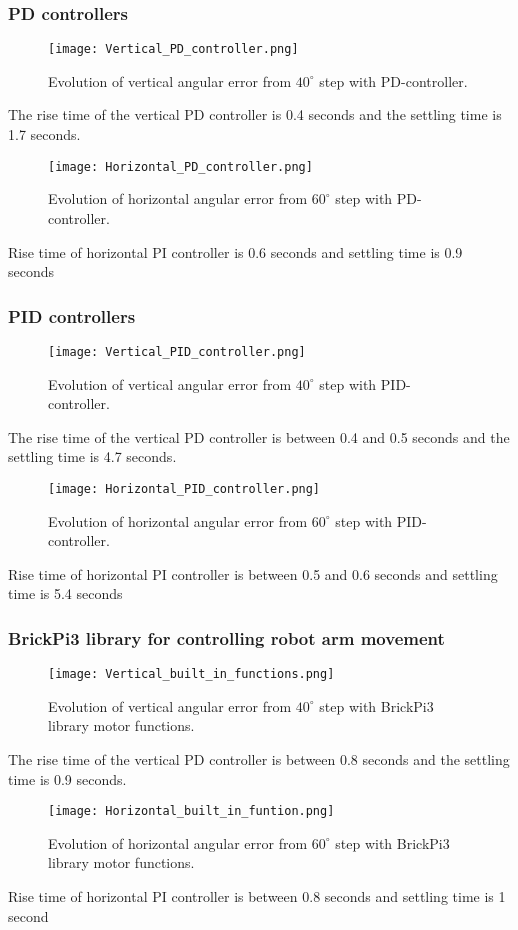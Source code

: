 \subsubsection{PD controllers}
\begin{figure}[H]
\centering
\texttt{[image: Vertical\_PD\_controller.png]}
\caption{Evolution of vertical angular error from \(40^{\circ}\) step with PD-controller.}
\label{vert_P}
\end{figure}
The rise time of the vertical PD controller is 0.4 seconds and the settling time is 1.7 seconds.
\begin{figure}[H]
\centering
\texttt{[image: Horizontal\_PD\_controller.png]}
\caption{Evolution of horizontal angular error from \(60^{\circ}\) step with PD-controller.}
\label{vert_P}
\end{figure}
Rise time of horizontal PI controller is 0.6 seconds and settling time is 0.9 seconds

\subsubsection{PID controllers}
\begin{figure}[H]
\centering
\texttt{[image: Vertical\_PID\_controller.png]}
\caption{Evolution of vertical angular error from \(40^{\circ}\) step with PID-controller.}
\label{vert_P}
\end{figure}
The rise time of the vertical PD controller is between 0.4 and 0.5 seconds and the settling time is 4.7 seconds.
\begin{figure}[H]
\centering
\texttt{[image: Horizontal\_PID\_controller.png]}
\caption{Evolution of horizontal angular error from \(60^{\circ}\) step with PID-controller.}
\label{vert_P}
\end{figure}
Rise time of horizontal PI controller is between 0.5 and 0.6 seconds and settling time is 5.4 seconds

\subsubsection{BrickPi3 library for controlling robot arm movement}
\begin{figure}[H]
\centering
\texttt{[image: Vertical\_built\_in\_functions.png]}
\caption{Evolution of vertical angular error from \(40^{\circ}\) step with BrickPi3 library motor functions.}
\label{vert_P}
\end{figure}
The rise time of the vertical PD controller is between 0.8 seconds and the settling time is 0.9 seconds.
\begin{figure}[H]
\centering
\texttt{[image: Horizontal\_built\_in\_funtion.png]}
\caption{Evolution of horizontal angular error from \(60^{\circ}\) step with BrickPi3 library motor functions.}
\label{vert_P}
\end{figure}
Rise time of horizontal PI controller is between 0.8 seconds and settling time is 1 second

